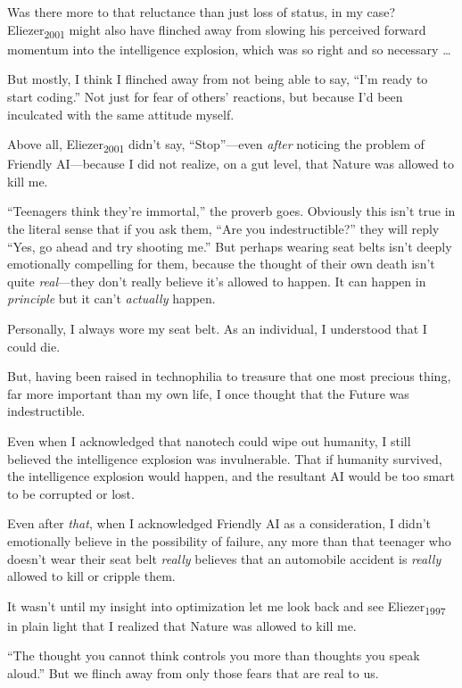 {
 Was there more to that reluctance than just loss of status, in my
case? Eliezer\textsubscript{2001} might also have flinched away from
slowing his perceived forward momentum into the intelligence explosion,
which was so right and so necessary \ldots}

{
 But mostly, I think I flinched away from not being able to say,
``I'm ready to start
coding.'' Not just for fear of
others' reactions, but because I'd been
inculcated with the same attitude myself.}

{
 Above all, Eliezer\textsubscript{2001} didn't say,
``Stop''---even \textit{after}
noticing the problem of Friendly AI---because I did not realize, on a
gut level, that Nature was allowed to kill me.}

{
 ``Teenagers think they're
immortal,'' the proverb goes. Obviously this
isn't true in the literal sense that if you ask them,
``Are you indestructible?'' they
will reply ``Yes, go ahead and try shooting
me.'' But perhaps wearing seat belts
isn't deeply emotionally compelling for them, because
the thought of their own death isn't quite
\textit{real}{}---they don't really believe
it's allowed to happen. It can happen in
\textit{principle} but it can't \textit{actually}
happen.}

{
 Personally, I always wore my seat belt. As an individual, I
understood that I could die.}

{
 But, having been raised in technophilia to treasure that one most
precious thing, far more important than my own life, I once thought
that the Future was indestructible.}

{
 Even when I acknowledged that nanotech could wipe out humanity, I
still believed the intelligence explosion was invulnerable. That if
humanity survived, the intelligence explosion would happen, and the
resultant AI would be too smart to be corrupted or lost.}

{
 Even after \textit{that}, when I acknowledged Friendly AI as a
consideration, I didn't emotionally believe in the
possibility of failure, any more than that teenager who
doesn't wear their seat belt \textit{really} believes
that an automobile accident is \textit{really} allowed to kill or
cripple them.}

{
 It wasn't until my insight into optimization let
me look back and see Eliezer\textsubscript{1997} in plain light that I
realized that Nature was allowed to kill me.}

{
 ``The thought you cannot think controls you more
than thoughts you speak aloud.'' But we flinch away
from only those fears that are real to us.}

